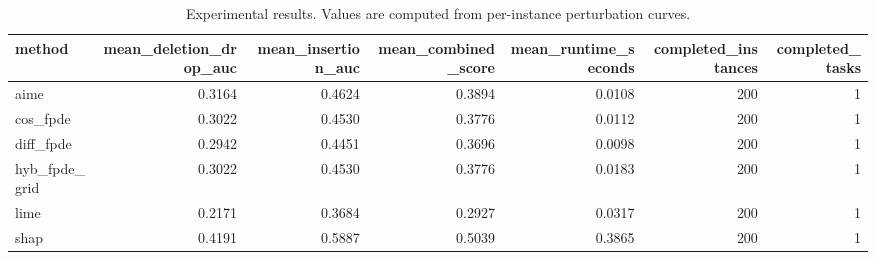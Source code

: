 \begin{table}[t]
\caption{Experimental results. Values are computed from per-instance perturbation curves.}
\label{tab:main_results_computed}
\centering
\begin{tabular}{lrrrrrr}
\toprule
method & mean\_deletion\_drop\_auc & mean\_insertion\_auc & mean\_combined\_score & mean\_runtime\_seconds & completed\_instances & completed\_tasks \\
\midrule
aime & 0.3164 & 0.4624 & 0.3894 & 0.0108 & 200 & 1 \\
cos\_fpde & 0.3022 & 0.4530 & 0.3776 & 0.0112 & 200 & 1 \\
diff\_fpde & 0.2942 & 0.4451 & 0.3696 & 0.0098 & 200 & 1 \\
hyb\_fpde\_grid & 0.3022 & 0.4530 & 0.3776 & 0.0183 & 200 & 1 \\
lime & 0.2171 & 0.3684 & 0.2927 & 0.0317 & 200 & 1 \\
shap & 0.4191 & 0.5887 & 0.5039 & 0.3865 & 200 & 1 \\
\bottomrule
\end{tabular}

\end{table}
